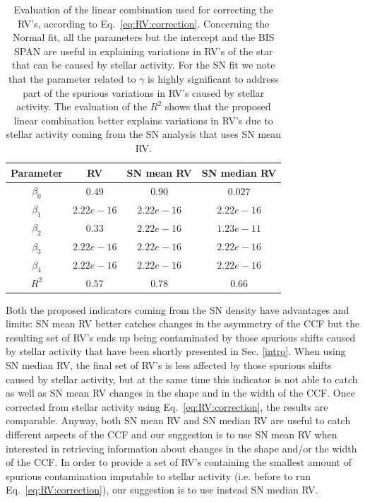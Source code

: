 \documentclass[11pt, oneside]{article}
\begin{document}
\begin{table}
\centering
\begin{tabular}{|c|c|c|c|}
\hline
Parameter          & RV         &   SN mean RV &   SN median RV \\
\hline
$\beta_{0}$            &    $0.49$    & $0.90 $  & $0.027$ \\
\hline
$\beta_{1}$            &    $2.22e-16$    & $2.22e-16 $  & $2.22e-16$ \\
\hline
$\beta_{2}$            &     $0.33$   & $2.22e-16 $ & $1.23e-11$\\
\hline
$\beta_{3}$            &     $ 2.22e-16$   &  $2.22e-16 $  & $ 2.22e-16$\\
\hline
$\beta_{4}$            &     $2.22e-16$   &  $2.22e-16 $ & $ 2.22e-16 $\\
\hline
$R^{2}$      &     $0.57$    &  $0.78$ & $0.66$  \\
\hline
\end{tabular}
\caption{Evaluation of the linear combination used for correcting the RV's, according to Eq.~\ref{eq:RV:correction}. Concerning the Normal fit, all the parameters but the intercept and the BIS SPAN are useful in explaining variations in RV's of the star that can be caused by stellar activity. For the SN fit we note that the parameter related to $\gamma$ is highly significant to address part of the spurious variations in RV's caused by stellar activity. The evaluation of the $R^2$ shows that the proposed linear combination better explains variations in RV's due to stellar activity coming from the SN analysis that uses SN mean RV.}
\label{table:alphacent.test}
\end{table}

Both the proposed indicators coming from the SN density have advantages and limits: SN mean RV better catches changes in the asymmetry of the CCF but the resulting set of RV's ends up being contaminated by those spurious shifts caused by stellar activity that have been shortly presented in Sec. \ref{intro}. When using SN median RV, the final set of RV's is less affected by those spurious shifts caused by stellar activity, but at the same time this indicator is not able to catch as well as SN mean RV changes in the shape and in the width of the CCF. Once corrected from stellar activity using Eq.~\ref{eq:RV:correction}, the results are comparable. Anyway, both SN mean RV and SN median RV are useful to catch different aspects of the CCF and our suggestion is to use SN mean RV when interested in retrieving information about changes in the shape and/or the width of the CCF. In order to provide a set of RV's containing the smallest amount of spurious contamination imputable to stellar activity (i.e. before to run Eq.~\ref{eq:RV:correction}), our suggestion is to use instead SN median RV. 
\end{document}

